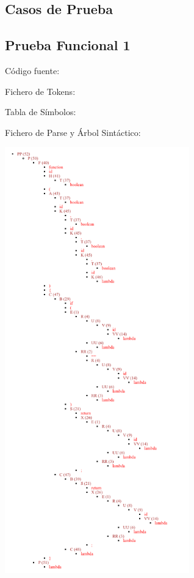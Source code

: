 \documentclass{article}[a4paper]
\begin{document}
\begin{appendices}

\section{Casos de Prueba}

\subsection{Prueba Funcional 1}
Código fuente:

\hspace{\parindent} Fichero de Tokens:

\hspace{\parindent} Tabla de Símbolos:

\hspace{\parindent} Fichero de Parse y Árbol Sintáctico:

\includegraphics[width=0.6\textwidth]{arbol1.png}


\end{appendices}
\end{document}
